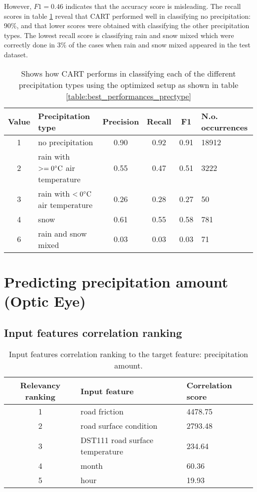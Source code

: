 	However, $F1 = 0.46$ indicates that the accuracy score is misleading. The recall scores in table \ref{table:classreport_prectype} reveal that CART performed well in classifying no precipitation: 90\%, and that lower scores were obtained with classifying the other precipitation types. The lowest recall score is classifying rain and snow mixed which were correctly done in 3\% of the cases when rain and snow mixed appeared in the test dataset. 

	\begin{table}[H]
		\centering
		\caption{Shows how CART performs in classifying each of the different precipitation types using the optimized setup as shown in table \ref{table:best_performances_prectype}}
		\begin{tabular}[6]{c |l | c | c | c | l }
    			Value & Precipitation type & Precision & Recall & F1 & N.o. occurrences \\
			\hline
			1 & no precipitation & 0.90 & 0.92 & 0.91 & 18912 \\ \hline
			2 & rain with $>= 0 \celsius$ air temperature & 0.55 & 0.47 & 0.51 & 3222 \\ \hline
			3 & rain with $< 0 \celsius$ air temperature & 0.26 & 0.28 & 0.27 & 50 \\ \hline
			4 & snow & 0.61 & 0.55 & 0.58 & 781 \\ \hline
			6 & rain and snow mixed & 0.03 & 0.03 & 0.03 & 71
			\label{table:classreport_prectype}
		\end{tabular}
	\end{table}



\section{Predicting precipitation amount (Optic Eye)} 
	\subsection{Input features correlation ranking}

	\begin{table}[H]
		\centering
		\caption{Input features correlation ranking to the target feature: precipitation amount. }
		\begin{tabular}[3]{c | l | l }
    			Relevancy ranking & Input feature & Correlation score  \\
			 \hline
			1 & road friction & 4478.75 \\ \hline
			2 & road surface condition & 2793.48 \\ \hline
			3 & DST111 road surface temperature & 234.64 \\ \hline
			4 & month & 60.36 \\ \hline
			5 & hour & 19.93 
			\label{table:feature_comparison_precamount}
		\end{tabular}
	\end{table}

